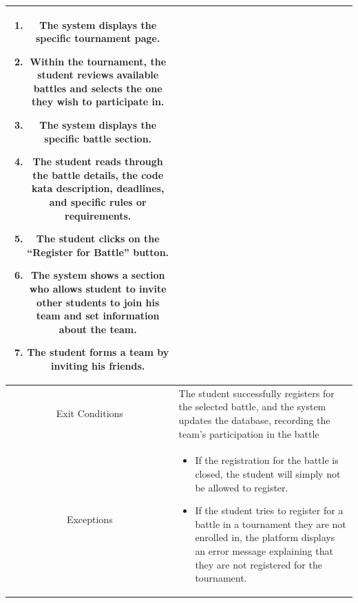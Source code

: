 \begin{longtable}{|c| p{10cm}|}
\begin{enumerate}
                                \item The system displays the specific tournament page.
                                \item Within the tournament, the student reviews available battles and selects the one they wish to participate in.
                                \item  The system displays the specific battle section.
                                \item The student reads through the battle details, the code kata description, deadlines, and specific rules or requirements. 
                                \item The student clicks on the “Register for Battle” button.
                                \item The system shows a section who allows student to invite other students to join his team and set information about the team.
                                \item  The student forms a team by inviting his friends.
                            \end{enumerate} \\
        \hline
            Exit Conditions &
                                     The student successfully registers for the selected battle, and the system updates the database, recording the team’s participation in the battle
                               \\
        \hline
            Exceptions & 
            \begin{itemize}
                \item If the registration for the battle is closed, the student will simply not be allowed to register.
                \item If the student tries to register for a battle in a tournament they are not enrolled in, the platform displays an error message explaining that they are not registered for the tournament.
                
            \end{itemize}\\
        \hline
    \end{longtable}
